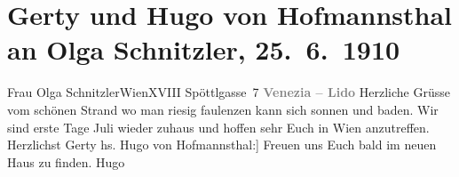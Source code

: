 

         
         \renewcommand{\erwaehntePersonen}{Personen: Olga Schnitzler}
         \renewcommand{\erwaehnteOrte}{Orte: Edmund-Weiß-Gasse, Lido, Santa Maria Elisabetta, Wien}
         \renewcommand{\erwaehnteWerke}{}
               \section[Gerty und Hugo von Hofmannsthal an Olga Schnitzler, 25. 6. 1910]{ Gerty und Hugo von Hofmannsthal an Olga Schnitzler, 25. 6. 1910}\nopagebreak{}\rehead{ }\begin{ledgroupsized}[t]{13cm}\normalsize\beginnumbering \toendnotes[C]{\smallbreak\pagebreak[2]} 
\pstart{}{\pb}Frau Olga Schnitzler\pend{}\pstart{}Wien\pend{}\pstart{}XVIII Spöttlgasse 7\pend{}{\bigskip}\pstart
           \noindent{}\centering{}\textcolor{gray}{\textbf{{\pb}Venezia – Lido}}\pend
           \pstart
           {\pb}Herzliche Grüsse vom schönen Strand wo
               man riesig faulenzen kann sich sonnen und baden. Wir sind erste Tage
                  Juli wieder zuhaus und hoffen sehr Euch in Wien anzutreffen.\pend
           \pstart Herzlichst \spacefill\mbox{Gerty}\pend{}\pstart
           \noindent{}{[}hs. Hugo von Hofmannsthal:{]} Freuen uns Euch bald im neuen Haus zu finden.\pend
           \pstart \spacefill\mbox{Hugo}\pend{}
         
         \endnumbering{}\end{ledgroupsized}  \newcommand{\dateiname}{L01938}\newcommand{\titel}{Gerty und Hugo von Hofmannsthal an Olga Schnitzler, 25. 6. 1910}\newcommand{\editorInnen}{Martin Anton Müller und Gerd-Hermann Susen}
      